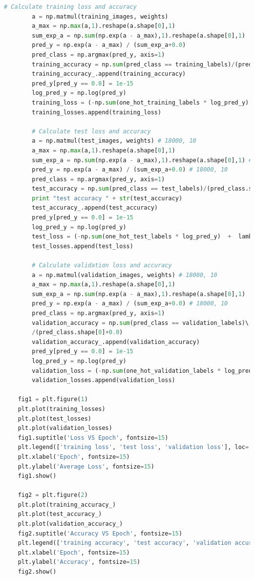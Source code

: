 \documentclass{article} %
\begin{document}
{\begin{lstlisting}[language=Python]
		# Calculate training loss and accuracy
		a = np.matmul(training_images, weights) 
		a_max = np.max(a,1).reshape(a.shape[0],1)
		sum_exp_a = np.sum(np.exp(a - a_max),1).reshape(a.shape[0],1) 
		pred_y = np.exp(a - a_max) / (sum_exp_a+0.0) 
		pred_class = np.argmax(pred_y, axis=1)
		training_accuracy = np.sum(pred_class == training_labels)/(pred_class.shape[0]+0.0)
		training_accuracy_.append(training_accuracy)
		pred_y[pred_y == 0.0] = 1e-15
		log_pred_y = np.log(pred_y)
		training_loss = (-np.sum(one_hot_training_labels * log_pred_y)  + lambd*LA.norm(weights)**2) / training_images.shape[0]
		training_losses.append(training_loss)

		# Calculate test loss and accuracy
		a = np.matmul(test_images, weights) # 18000, 10
		a_max = np.max(a,1).reshape(a.shape[0],1)
		sum_exp_a = np.sum(np.exp(a - a_max),1).reshape(a.shape[0],1) # 18000, 1
		pred_y = np.exp(a - a_max) / (sum_exp_a+0.0) # 18000, 10
		pred_class = np.argmax(pred_y, axis=1)
		test_accuracy = np.sum(pred_class == test_labels)/(pred_class.shape[0]+0.0)
		print "test accuracy " + str(test_accuracy)
		test_accuracy_.append(test_accuracy)
		pred_y[pred_y == 0.0] = 1e-15
		log_pred_y = np.log(pred_y)
		test_loss = (-np.sum(one_hot_test_labels * log_pred_y)  +  lambd*LA.norm(weights)**2) / test_images.shape[0]
		test_losses.append(test_loss)

		# Calculate validation loss and accuracy
		a = np.matmul(validation_images, weights) # 18000, 10
		a_max = np.max(a,1).reshape(a.shape[0],1)
		sum_exp_a = np.sum(np.exp(a - a_max),1).reshape(a.shape[0],1) 
		pred_y = np.exp(a - a_max) / (sum_exp_a+0.0) # 18000, 10
		pred_class = np.argmax(pred_y, axis=1)
		validation_accuracy = np.sum(pred_class == validation_labels)\ 
		/(pred_class.shape[0]+0.0) 
		validation_accuracy_.append(validation_accuracy)
		pred_y[pred_y == 0.0] = 1e-15
		log_pred_y = np.log(pred_y)
		validation_loss = (-np.sum(one_hot_validation_labels * log_pred_y)  +  lambd*LA.norm(weights)**2)\ / validation_images.shape[0]
		validation_losses.append(validation_loss) 
	
	fig1 = plt.figure(1)
	plt.plot(training_losses)
	plt.plot(test_losses)
	plt.plot(validation_losses)
	fig1.suptitle('Loss VS Epoch', fontsize=15)
	plt.legend(['training loss', 'test loss', 'validation loss'], loc='upper right')
	plt.xlabel('Epoch', fontsize=15)
	plt.ylabel('Average Loss', fontsize=15)
	fig1.show()

	fig2 = plt.figure(2)
	plt.plot(training_accuracy_)
	plt.plot(test_accuracy_)
	plt.plot(validation_accuracy_)
	fig2.suptitle('Accuracy VS Epoch', fontsize=15)
	plt.legend(['training accuracy', 'test accuracy', 'validation accuracy'], loc='lower right')
	plt.xlabel('Epoch', fontsize=15)
	plt.ylabel('Accuracy', fontsize=15)
	fig2.show()


\end{lstlisting}}
\end{document}
